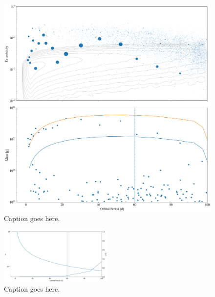 \documentclass[twocolumn]{aastex63}
\begin{document}
\begin{figure}
\begin{center}
    \includegraphics[width=\textwidth]{figures/fulldisk_e_m.png}
    \caption{Caption goes here.\label{fig:fulldisk_e_m}}
\end{center}
\end{figure}

\begin{figure}
\begin{center}
    \includegraphics[width=0.5\textwidth]{figures/alpha_pl_frac.png}
    \caption{Caption goes here.\label{fig:alpha_pl_frac}}
\end{center}
\end{figure}

\end{document}
